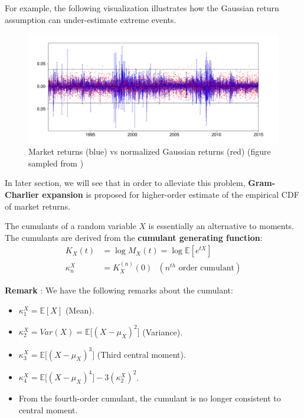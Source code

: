 \noindent\newline For example, the following visualization illustrates how the Gaussian return assumption can under-estimate extreme events.
\begin{figure}[ht]
    \centering
    \includegraphics[width=\textwidth]{figures/emprical-vs-gaussian-cdf.png}
    \caption{Market returns (blue) vs normalized Gaussian returns (red) (figure sampled from \cite{book:privault})}
    \label{fig:empirical-vs-gaussian-cdfs}
\end{figure}

\noindent \newline In later section, we will see that in order to alleviate this problem, \textbf{Gram-Charlier expansion} is proposed for higher-order estimate of the empirical CDF of market returns.

\begin{definition}[Cumulants]
    The cumulants of a random variable $X$ is essentially an alternative to moments. The cumulants are derived from the \textbf{cumulant generating function}:
    \begin{align*}
        K_X(t) &= \log M_X(t) = \log \mathbb{E}[e^{tX}] \\
        \kappa_n^X &= K_X^{(n)}(0) \ \ \ (n^{th} \text{ order cumulant})
    \end{align*}
\end{definition}

\textbf{Remark} : We have the following remarks about the cumulant:
\begin{itemize}
    \item $\kappa_1^X=\mathbb{E}[X]$ (Mean).
    \item $\kappa_2^X=Var(X)=\mathbb{E}\Big[ (X - \mu_X)^2 \Big]$ (Variance).
    \item $\kappa_3^X=\mathbb{E}\Big[ (X - \mu_X)^3 \Big]$ (Third central moment).
    \item $\kappa_4^X=\mathbb{E}\Big[ (X - \mu_X)^4 \Big] - 3(\kappa_2^X)^2$.
    \item From the fourth-order cumulant, the cumulant is no longer consistent to central moment.
\end{itemize}

